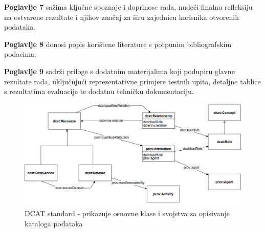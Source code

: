 \textbf{Poglavlje 7} sažima ključne spoznaje i doprinose rada, nudeći finalnu refleksiju na ostvarene rezultate i njihov značaj za širu zajednicu korisnika otvorenih podataka.

\textbf{Poglavlje 8} donosi popis korištene literature s potpunim bibliografskim podacima.

\textbf{Poglavlje 9} sadrži priloge s dodatnim materijalima koji podupiru glavne rezultate rada, uključujući reprezentativne primjere testnih upita, detaljne tablice s rezultatima evaluacije te dodatnu tehničku dokumentaciju.

\begin{figure}[h!]
    \centering
    \includegraphics[width=1\textwidth]{figures/dcat.png}
    \caption{DCAT standard - prikazuje osnovne klase i svojstva za opisivanje kataloga podataka~\cite{dcat2020}}
    \label{fig:dcat_standard}
\end{figure}